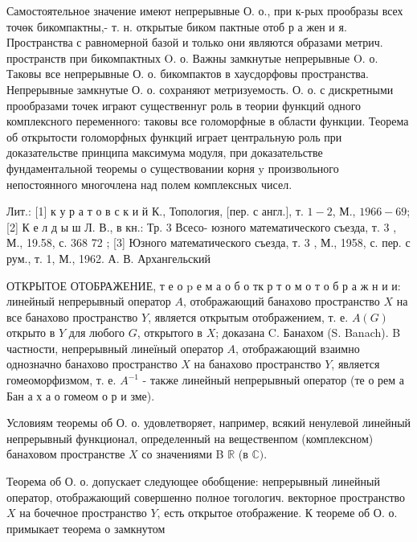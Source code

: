 \documentclass[10pt]{article}
\begin{document}
Самостоятельное значение имеют непрерывные О. о., при к-рых прообразы всех точөк бикомпактны,- т. н. открытые биком пактные отоб р а жен и я. Пространства с равномерной базой и только они являются образами метрич. пространств при бикомпактных $\mathrm{O}$. о. Важны замкнутые непрерывные $\mathrm{O}$. о. Таковы все непрерывные О. о. бикомпактов в хаусдорфовы пространства. Непрерывные замкнутые О. о. сохраняют метризуемость. О. о. с дискретными прообразами точек играют существеннуг роль в теории функций одного комплексного переменного: таковы все голоморфные в области функции. Теорема об открытости голоморфных функций играет центральную роль при доказательстве принципа максимума модуля, при доказательстве фундаментальной теоремы о существовании корня $\mathrm{y}$ произвольного непостоянного многочлена над полем комплексных чисел.

Лит.: [1] к у р а т о в с к и й К., Топология, [пер. с англ.], т. $1-2$, М., $1966-69$; [2] К е л д ы ш Л. В., в кн.: Тр. 3 Всесо-
юзного математического съезда, т. 3 , М., 19.58, с. 368 72 ; [3] Юзного математического съезда, т. 3 , М., 1958, с. пер. с рум., т. 1, М., 1962. А. В. Архангельский

ОТКРЫТОЕ ОТОБРАЖЕНИЕ, т е о $\mathrm{p}$ е $м$ а о б о тк р т о м о т о б р а ж н и и: линейный непрерывный оператор $A$, отображающий банахово пространство $X$ на все банахово пространство $Y$, является открытым отображением, т. е. $A(G)$ открыто в $Y$ для любого $G$, открытого в $X$; доказана C. Банахом (S. Banach). B частности, непрерывный линеїный оператор $A$, отображающий взаимно однозначно банахово пространство $X$ на банахово пространство $Y$, является гомеоморфизмом, т. е. $A^{-1}$ - также линейный непрерывный оператор (те о рем а Бан а х а о гомеом о р и зме).

Условиям теоремы об О. о. удовлетворяет, например, всякий ненулевой линейный непрерывный функционал, определенный на вещественпом (комплексном) банаховом пространстве $X$ со значениями B $\mathbb{R}$ (в $\mathbb{C})$.

Теорема об О. о. допускает следующее обобщение: непрерывный линейный оператор, отображающий совершенно полное тогологич. векторное пространство $X$ на бочечное пространство $Y$, есть открытое отображение. $К$ теореме об О. о. примыкает теорема о замкнутом
\end{document}
